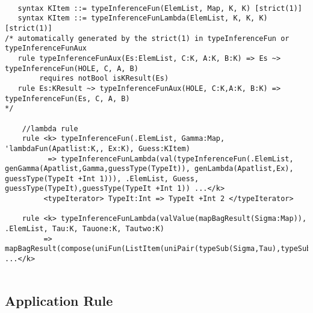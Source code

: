 \begin{prooftree}
\end{prooftree}

\begin{lstlisting}

   syntax KItem ::= typeInferenceFun(ElemList, Map, K, K) [strict(1)]
   syntax KItem ::= typeInferenceFunLambda(ElemList, K, K, K) [strict(1)]
/* automatically generated by the strict(1) in typeInferenceFun or typeInferenceFunAux
   rule typeInferenceFunAux(Es:ElemList, C:K, A:K, B:K) => Es ~> typeInferenceFun(HOLE, C, A, B)
        requires notBool isKResult(Es)
   rule Es:KResult ~> typeInferenceFunAux(HOLE, C:K,A:K, B:K) => typeInferenceFun(Es, C, A, B)
*/     

    //lambda rule
    rule <k> typeInferenceFun(.ElemList, Gamma:Map, 'lambdaFun(Apatlist:K,, Ex:K), Guess:KItem)
          => typeInferenceFunLambda(val(typeInferenceFun(.ElemList, genGamma(Apatlist,Gamma,guessType(TypeIt)), genLambda(Apatlist,Ex), guessType(TypeIt +Int 1))), .ElemList, Guess, guessType(TypeIt),guessType(TypeIt +Int 1)) ...</k>
         <typeIterator> TypeIt:Int => TypeIt +Int 2 </typeIterator>

    rule <k> typeInferenceFunLambda(valValue(mapBagResult(Sigma:Map)), .ElemList, Tau:K, Tauone:K, Tautwo:K)
         => mapBagResult(compose(uniFun(ListItem(uniPair(typeSub(Sigma,Tau),typeSub(Sigma,funtype(Tauone,Tautwo))))),Sigma)) ...</k>
    
\end{lstlisting}

\subsection{Application Rule}

\begin{prooftree}
\end{prooftree}

